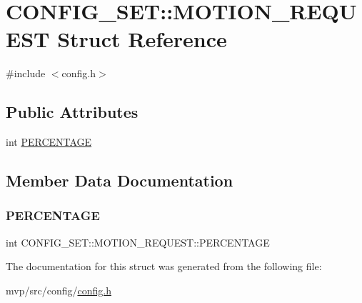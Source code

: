 \hypertarget{structCONFIG__SET_1_1MOTION__REQUEST}{}\section{C\+O\+N\+F\+I\+G\+\_\+\+S\+ET\+:\+:M\+O\+T\+I\+O\+N\+\_\+\+R\+E\+Q\+U\+E\+ST Struct Reference}
\label{structCONFIG__SET_1_1MOTION__REQUEST}


{\ttfamily \#include $<$config.\+h$>$}

\subsection*{Public Attributes}
\begin{DoxyCompactItemize}
\item 
int \hyperlink{structCONFIG__SET_1_1MOTION__REQUEST_acf3565185dc58fd595e937c2a7542742}{P\+E\+R\+C\+E\+N\+T\+A\+GE}
\end{DoxyCompactItemize}


\subsection{Member Data Documentation}
\mbox{\label{structCONFIG__SET_1_1MOTION__REQUEST_acf3565185dc58fd595e937c2a7542742}} 
\subsubsection{\texorpdfstring{P\+E\+R\+C\+E\+N\+T\+A\+GE}{PERCENTAGE}}
{\footnotesize\ttfamily int C\+O\+N\+F\+I\+G\+\_\+\+S\+E\+T\+::\+M\+O\+T\+I\+O\+N\+\_\+\+R\+E\+Q\+U\+E\+S\+T\+::\+P\+E\+R\+C\+E\+N\+T\+A\+GE}



The documentation for this struct was generated from the following file\+:\begin{DoxyCompactItemize}
\item 
mvp/src/config/\hyperlink{config_8h}{config.\+h}\end{DoxyCompactItemize}
